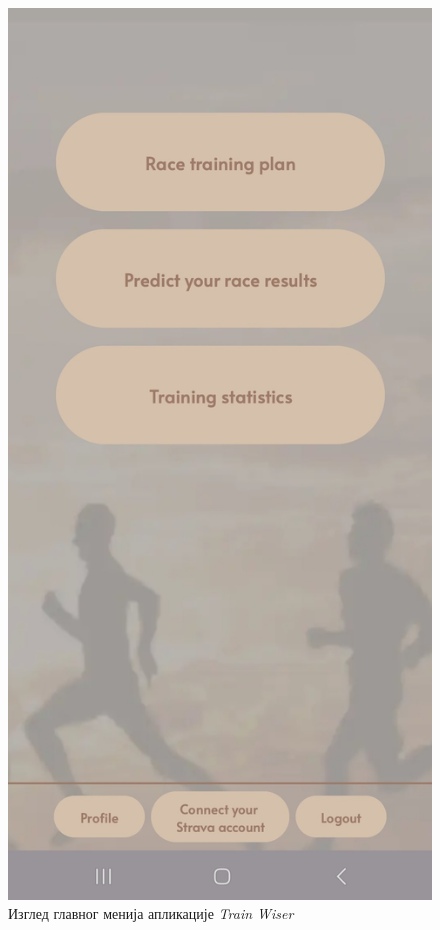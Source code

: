 \documentclass[12pt,oneside]{memoir}
\begin{document}
\begin{figure}[h]
  \centering
  \includegraphics[scale=0.1]{assets/pictures/app_screenshots/main_menu.jpg}
  \caption{Изглед главног менија апликације \textit{Train Wiser}}
  \label{pic:app_main_menu}
\end{figure}
\end{document}
